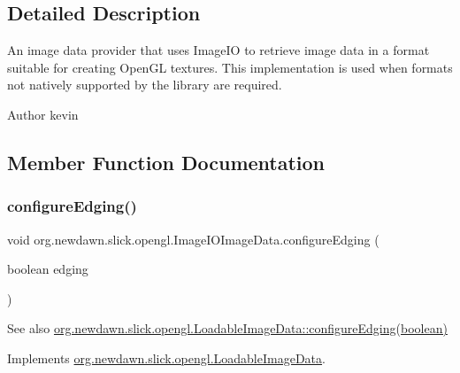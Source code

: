\subsection{Detailed Description}
An image data provider that uses Image\+IO to retrieve image data in a format suitable for creating Open\+GL textures. This implementation is used when formats not natively supported by the library are required.

\begin{DoxyAuthor}{Author}
kevin 
\end{DoxyAuthor}


\subsection{Member Function Documentation}
\mbox{\label{classorg_1_1newdawn_1_1slick_1_1opengl_1_1_image_i_o_image_data_a6329973823fe6d99e2238530bac60a60}} 
\subsubsection{\texorpdfstring{configure\+Edging()}{configureEdging()}}
{\footnotesize\ttfamily void org.\+newdawn.\+slick.\+opengl.\+Image\+I\+O\+Image\+Data.\+configure\+Edging (\begin{DoxyParamCaption}\item[{boolean}]{edging }\end{DoxyParamCaption})\hspace{0.3cm}{\ttfamily [inline]}}

\begin{DoxySeeAlso}{See also}
\mbox{\hyperlink{interfaceorg_1_1newdawn_1_1slick_1_1opengl_1_1_loadable_image_data_a1f9fb94bae3936761535408ba7afc0df}{org.\+newdawn.\+slick.\+opengl.\+Loadable\+Image\+Data\+::configure\+Edging(boolean)}} 
\end{DoxySeeAlso}


Implements \mbox{\hyperlink{interfaceorg_1_1newdawn_1_1slick_1_1opengl_1_1_loadable_image_data_a1f9fb94bae3936761535408ba7afc0df}{org.\+newdawn.\+slick.\+opengl.\+Loadable\+Image\+Data}}.


